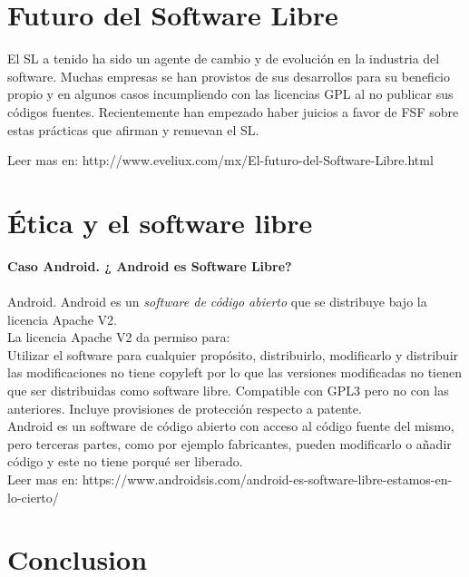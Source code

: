 \section{Futuro del Software Libre}


	El SL a tenido ha sido un agente de cambio y de evolución en la industria del software.
Muchas empresas se han provistos de sus desarrollos para su beneficio propio y en algunos casos incumpliendo con las licencias GPL al no publicar sus códigos fuentes.
	Recientemente han empezado haber juicios a favor de FSF sobre estas prácticas que afirman y renuevan el SL.

Leer mas en: http://www.eveliux.com/mx/El-futuro-del-Software-Libre.html

\section{Ética y el software libre}

{\bf Caso Android. ¿ Android es Software Libre?}
\\
\\
Android. Android es un \emph{software de código abierto} que se distribuye bajo la licencia Apache V2.
\\
La licencia Apache V2 da permiso para:
\\
Utilizar el software para cualquier propósito, distribuirlo, modificarlo y distribuir las modificaciones
no tiene copyleft por lo que las versiones modificadas no tienen que ser distribuidas como software libre.
Compatible con GPL3 pero no con las anteriores.
Incluye provisiones de protección respecto a patente.
\\
Android es un software de código abierto con  acceso al código fuente del mismo, pero terceras partes, como por ejemplo fabricantes, pueden modificarlo o añadir código y este no tiene porqué ser liberado. 
\\
Leer mas en: https://www.androidsis.com/android-es-software-libre-estamos-en-lo-cierto/

\section{Conclusion}
	
